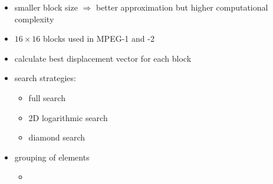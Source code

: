 \documentclass[a4paper,10pt]{scrreprt}
\begin{document}
\begin{itemize}
\begin{itemize}
  \item smaller block size $\Rightarrow$ better approximation but higher computational complexity
  \item $16 \times 16 $ blocks used in MPEG-1 and -2
  \item calculate best displacement vector for each block
  \item search strategies:
  \begin{itemize}
   \item full search
   \item 2D logarithmic search
   \item diamond search
  \end{itemize}
  \item grouping of elements
  \begin{itemize}
   \item 
  \end{itemize}


 \end{itemize}


\end{itemize}
\end{document}
